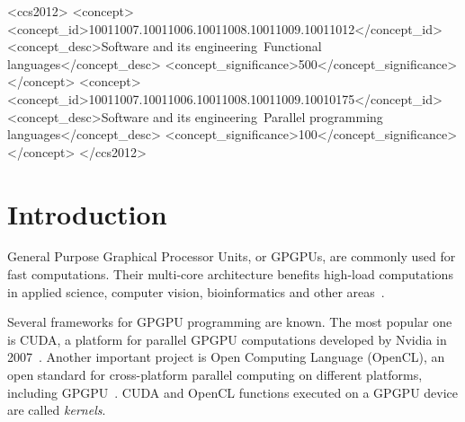 \documentclass[sigplan,review]{acmart}\settopmatter{printfolios=true}
\begin{document}
\begin{CCSXML}
<ccs2012>
<concept>
<concept_id>10011007.10011006.10011008.10011009.10011012</concept_id>
<concept_desc>Software and its engineering~Functional languages</concept_desc>
<concept_significance>500</concept_significance>
</concept>
<concept>
<concept_id>10011007.10011006.10011008.10011009.10010175</concept_id>
<concept_desc>Software and its engineering~Parallel programming languages</concept_desc>
<concept_significance>100</concept_significance>
</concept>
</ccs2012>
\end{CCSXML}




\maketitle


\section{Introduction} %

General Purpose Graphical Processor Units, or GPGPUs, are commonly used for fast computations. Their multi-core architecture benefits high-load computations in applied science, computer vision, bioinformatics and other areas~\cite{CUDA_to_OpenCL, GPGPU_1}.

Several frameworks for GPGPU programming are known. The most popular one is CUDA, a platform for parallel GPGPU computations developed by Nvidia in 2007~\cite{CUDA}. Another important project is Open Computing Language (OpenCL), an open standard for cross-platform parallel computing on different platforms, including GPGPU~\cite{OpenCL}. CUDA and OpenCL functions executed on a GPGPU device are called \textit{kernels}.
\end{document}
